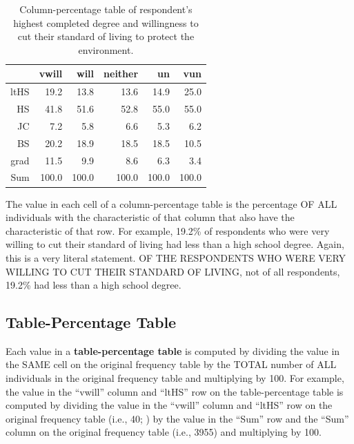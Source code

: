 \documentclass[10pt,openany]{book}\usepackage[]{graphicx}\usepackage[]{color}
\begin{document}
\begin{table}[ht]
\centering
\caption{Column-percentage table of respondent's highest completed degree and willingness to cut their standard of living to protect the environment.} 
\label{tab:EnvColP}
\begin{tabular}{rrrrrr}
  \hline
 & vwill & will & neither & un & vun \\ 
  \hline
ltHS & 19.2 & 13.8 & 13.6 & 14.9 & 25.0 \\ 
  HS & 41.8 & 51.6 & 52.8 & 55.0 & 55.0 \\ 
  JC & 7.2 & 5.8 & 6.6 & 5.3 & 6.2 \\ 
  BS & 20.2 & 18.9 & 18.5 & 18.5 & 10.5 \\ 
  grad & 11.5 & 9.9 & 8.6 & 6.3 & 3.4 \\ 
  Sum & 100.0 & 100.0 & 100.0 & 100.0 & 100.0 \\ 
   \hline
\end{tabular}
\end{table}


The value in each cell of a column-percentage table is the percentage OF ALL individuals with the characteristic of that column that also have the characteristic of that row.  For example, 19.2\% of respondents who were very willing to cut their standard of living had less than a high school degree.  Again, this is a very literal statement.  OF THE RESPONDENTS WHO WERE VERY WILLING TO CUT THEIR STANDARD OF LIVING, not of all respondents, 19.2\% had less than a high school degree.


\vspace{-12pt}

\subsection{Table-Percentage Table}
Each value in a \textbf{table-percentage table} is computed by dividing the value in the SAME cell on the original frequency table by the TOTAL number of ALL individuals in the original frequency table and multiplying by 100.  For example, the value in the ``vwill'' column and ``ltHS'' row on the table-percentage table  is computed by dividing the value in the ``vwill'' column and ``ltHS'' row on the original frequency table (i.e., 40; ) by the value in the ``Sum'' row and the ``Sum'' column on the original frequency table (i.e., 3955) and multiplying by 100.
\end{document}
